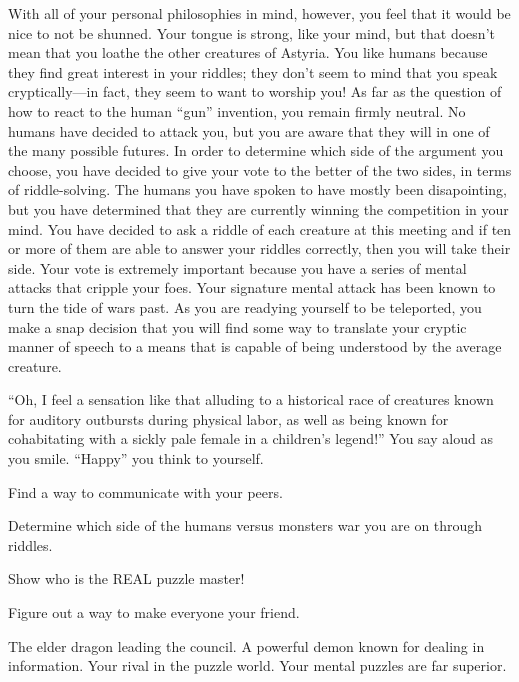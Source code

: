 \documentclass[char]{guildcamp2}
\begin{document}
With all of your personal philosophies in mind, however, you feel that it would be nice to not be shunned. Your tongue is strong, like your mind, but that doesn't mean that you loathe the other creatures of Astyria. You like humans because they find great interest in your riddles; they don't seem to mind that you speak cryptically---in fact, they seem to want to worship you! As far as the question of how to react to the human ``gun'' invention, you remain firmly neutral. No humans have decided to attack you, but you are aware that they will in one of the many possible futures. In order to determine which side of the argument you choose, you have decided to give your vote to the better of the two sides, in terms of riddle-solving. The humans you have spoken to have mostly been disapointing, but you have determined that they are currently winning the competition in your mind. You have decided to ask a riddle of each creature at this meeting and if ten or more of them are able to answer your riddles correctly, then you will take their side. Your vote is extremely important because you have a series of mental attacks that cripple your foes. Your signature mental attack has been known to turn the tide of wars past. As you are readying yourself to be teleported, you make a snap decision that you will find some way to translate your cryptic manner of speech to a means that is capable of being understood by the average creature. 

``Oh, I feel a sensation like that alluding to a historical race of creatures known for auditory outbursts during physical labor, as well as being known for cohabitating with a sickly pale female in a children's legend!'' You say aloud as you smile. ``Happy'' you think to yourself.

\begin{itemz}[Goals]
  \item Find a way to communicate with your peers.
  \item Determine which side of the humans versus monsters war you are on through riddles.
  \item Show \cMinotaur{} who is the REAL puzzle master!
  \item Figure out a way to make everyone your friend.
 
\end{itemz}

\begin{contacts}
  \contact{\cOnyx{}} The elder dragon leading the council.
  \contact{\cDemon{}} A powerful demon known for dealing in information.
  \contact{\cMinotaur{}} Your rival in the puzzle world. Your mental puzzles are far superior. 
\end{contacts}
\end{document}
